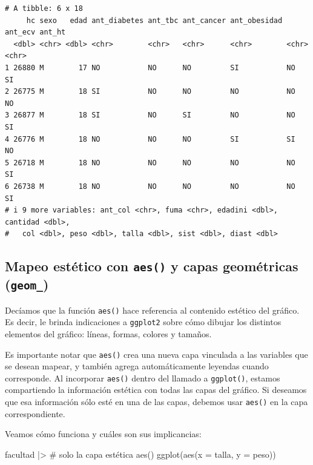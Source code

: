 \documentclass[
  spanish,
  letterpaper,
  DIV=11,
  numbers=noendperiod]{scrreprt}
\newenvironment{Shaded}{\begin{snugshade}}{\end{snugshade}}
\newcommand{\AttributeTok}[1]{\textcolor[rgb]{0.40,0.45,0.13}{#1}}
\newcommand{\CommentTok}[1]{\textcolor[rgb]{0.37,0.37,0.37}{#1}}
\newcommand{\FunctionTok}[1]{\textcolor[rgb]{0.28,0.35,0.67}{#1}}
\newcommand{\NormalTok}[1]{\textcolor[rgb]{0.00,0.23,0.31}{#1}}
\newcommand{\SpecialCharTok}[1]{\textcolor[rgb]{0.37,0.37,0.37}{#1}}
\begin{document}
\begin{verbatim}
# A tibble: 6 x 18
     hc sexo   edad ant_diabetes ant_tbc ant_cancer ant_obesidad ant_ecv ant_ht
  <dbl> <chr> <dbl> <chr>        <chr>   <chr>      <chr>        <chr>   <chr> 
1 26880 M        17 NO           NO      NO         SI           NO      SI    
2 26775 M        18 SI           NO      NO         NO           NO      NO    
3 26877 M        18 SI           NO      SI         NO           NO      SI    
4 26776 M        18 NO           NO      NO         SI           SI      NO    
5 26718 M        18 NO           NO      NO         NO           NO      SI    
6 26738 M        18 NO           NO      NO         NO           NO      SI    
# i 9 more variables: ant_col <chr>, fuma <chr>, edadini <dbl>, cantidad <dbl>,
#   col <dbl>, peso <dbl>, talla <dbl>, sist <dbl>, diast <dbl>
\end{verbatim}

\subsection{\texorpdfstring{Mapeo estético con \texttt{aes()} y capas
geométricas
(\texttt{geom\_})}{Mapeo estético con aes() y capas geométricas (geom\_)}}\label{mapeo-estuxe9tico-con-aes-y-capas-geomuxe9tricas-geom_}

Decíamos que la función \texttt{aes()} hace referencia al contenido
estético del gráfico. Es decir, le brinda indicaciones a
\texttt{ggplot2} sobre cómo dibujar los distintos elementos del gráfico:
líneas, formas, colores y tamaños.

Es importante notar que \texttt{aes()} crea una nueva capa vinculada a
las variables que se desean mapear, y también agrega automáticamente
leyendas cuando corresponde. Al incorporar \texttt{aes()} dentro del
llamado a \texttt{ggplot()}, estamos compartiendo la información
estética con todas las capas del gráfico. Si deseamos que esa
información sólo esté en una de las capas, debemos usar \texttt{aes()}
en la capa correspondiente.

Veamos cómo funciona y cuáles son sus implicancias:

\begin{Shaded}
\begin{Highlighting}[]
\NormalTok{facultad }\SpecialCharTok{|\textgreater{}}
  \CommentTok{\# solo la capa estética aes()}
  \FunctionTok{ggplot}\NormalTok{(}\FunctionTok{aes}\NormalTok{(}\AttributeTok{x =}\NormalTok{ talla, }\AttributeTok{y =}\NormalTok{ peso))}
\end{Highlighting}
\end{Shaded}
\end{document}
